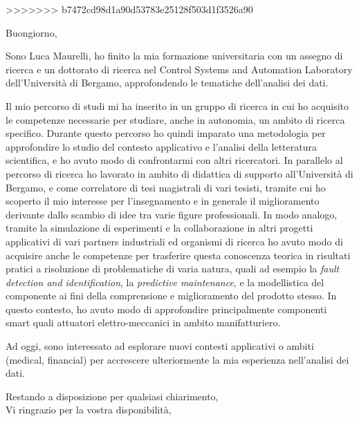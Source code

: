 \documentclass[10pt]{article}
\begin{document}
>>>>>>> b7472cd98d1a90d53783e25128f503d1f3526a90

Buongiorno,

Sono Luca Maurelli, ho finito la mia formazione universitaria con un assegno di ricerca e un dottorato di ricerca nel Control Systems and Automation Laboratory dell'Università di Bergamo, approfondendo le tematiche dell'analisi dei dati.

Il mio percorso di studi mi ha inserito in un gruppo di ricerca in cui ho acquisito le competenze necessarie per studiare, anche in autonomia, un ambito di ricerca specifico.
Durante questo percorso ho quindi imparato una metodologia per approfondire lo studio del contesto applicativo e l'analisi della letteratura scientifica, e ho avuto modo di confrontarmi con altri ricercatori.
In parallelo al percorso di ricerca ho lavorato in ambito di didattica di supporto all'Università di Bergamo, e come correlatore di tesi magistrali di vari tesisti, tramite cui ho scoperto il mio interesse per l'insegnamento e in generale il miglioramento derivante dallo scambio di idee tra varie figure professionali.
In modo analogo, tramite la simulazione di esperimenti e la collaborazione in altri progetti applicativi di vari partners industriali ed organismi di ricerca ho avuto modo di acquisire anche le competenze per trasferire questa conoscenza teorica in risultati pratici a risoluzione di problematiche di varia natura, quali ad esempio la \textit{fault detection and identification}, la \textit{predictive maintenance}, e la modellistica del componente ai fini della comprensione e miglioramento del prodotto stesso.
In questo contesto, ho avuto modo di approfondire principalmente componenti smart quali attuatori elettro-meccanici in ambito manifatturiero.

Ad oggi, sono interessato ad esplorare nuovi contesti applicativi o ambiti (medical, financial) per accrescere ulteriormente la mia esperienza nell'analisi dei dati.

Restando a disposizione per qualsiasi chiarimento,\\
Vi ringrazio per la vostra disponibilità,
\end{document}
